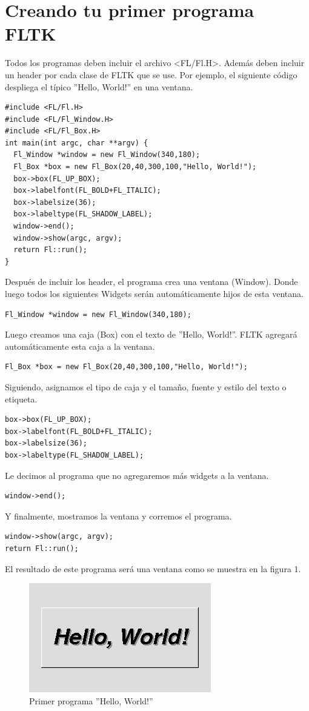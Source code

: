 \documentclass[10pt, oneside]{article}   	%
\begin{document}
\section{Creando tu primer programa FLTK}
Todos los programas deben incluir el archivo <FL/Fl.H>. Además deben incluir un header por cada clase de FLTK que se use. Por ejemplo, el siguiente código despliega el típico ''Hello, World!'' en una ventana.
\begin{lstlisting}
#include <FL/Fl.H>
#include <FL/Fl_Window.H>
#include <FL/Fl_Box.H>
int main(int argc, char **argv) {
  Fl_Window *window = new Fl_Window(340,180);
  Fl_Box *box = new Fl_Box(20,40,300,100,"Hello, World!");
  box->box(FL_UP_BOX);
  box->labelfont(FL_BOLD+FL_ITALIC);
  box->labelsize(36);
  box->labeltype(FL_SHADOW_LABEL);
  window->end();
  window->show(argc, argv);
  return Fl::run();
}
\end{lstlisting}
Después de incluir los header, el programa crea una ventana (Window). Donde luego todos los siguientes Widgets serán automáticamente hijos de esta ventana.
\begin{lstlisting}
Fl_Window *window = new Fl_Window(340,180);
\end{lstlisting}
Luego creamos una caja (Box) con el texto de ''Hello, World!''. FLTK agregará automáticamente esta caja a la ventana.
\begin{lstlisting}
Fl_Box *box = new Fl_Box(20,40,300,100,"Hello, World!");
\end{lstlisting}
Siguiendo, asignamos el tipo de caja y el tamaño, fuente y estilo del texto o etiqueta.
\begin{lstlisting}
box->box(FL_UP_BOX);
box->labelfont(FL_BOLD+FL_ITALIC);
box->labelsize(36);
box->labeltype(FL_SHADOW_LABEL);
\end{lstlisting}
Le decimos al programa que no agregaremos más widgets a la ventana.
\begin{lstlisting}
window->end();
\end{lstlisting}
Y finalmente, mostramos la ventana y corremos el programa.
\begin{lstlisting}
window->show(argc, argv);
return Fl::run();
\end{lstlisting}
El resultado de este programa será una ventana como se muestra en la figura 1.
\begin{figure}[h]
\begin{center}
\includegraphics[]{images/hello}
\caption{Primer programa ''Hello, World!''}
\label{helloworld}
\end{center}
\end{figure}
\end{document}
